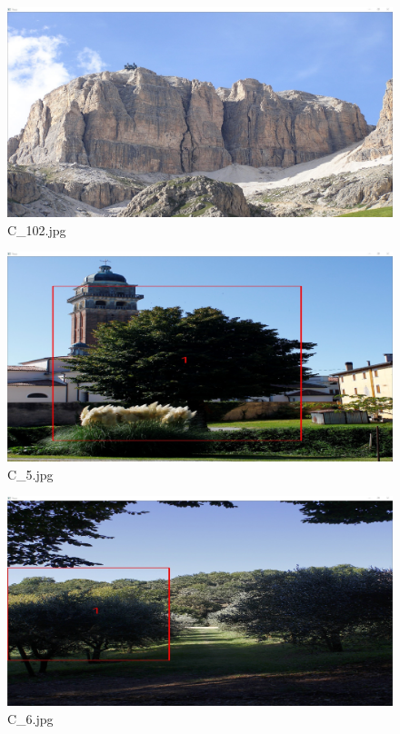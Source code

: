 \documentclass{article}
\begin{document}
\begin{figure}[h]
\begin{center}
\includegraphics[width=1\textwidth]{images/train102}
\caption{\footnotesize{C\_102.jpg}}
\label{img:train102}
\end{center}
\end{figure}

\begin{figure}[h]
\begin{center}
\includegraphics[width=1\textwidth]{images/train5}
\caption{\footnotesize{C\_5.jpg}}
\label{img:train5}
\end{center}
\end{figure}

\begin{figure}[h]
\begin{center}
\includegraphics[width=1\textwidth]{images/train6}
\caption{\footnotesize{C\_6.jpg}}
\label{img:train6}
\end{center}
\end{figure}
\end{document}
